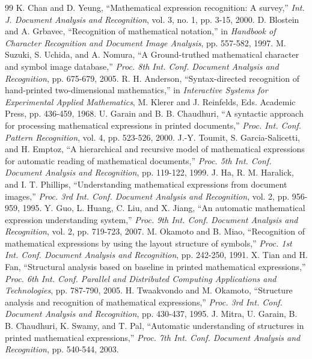 \documentclass[10pt]{article}
\begin{document}
\begin{thebibliography}{99}
 K. Chan and D. Yeung, ``Mathematical expression recognition: A survey,'' \textit{Int. J. Document Analysis and Recognition}, vol. 3, no. 1, pp. 3-15, 2000.
 D. Blostein and A. Grbavec, ``Recognition of mathematical notation,'' in \textit{Handbook of Character Recognition and Document Image Analysis}, pp. 557-582, 1997.
 M. Suzuki, S. Uchida, and A. Nomura, ``A Ground-truthed mathematical character and symbol image database,'' \textit{Proc. 8th Int. Conf. Document Analysis and Recognition}, pp. 675-679, 2005.
 R. H. Anderson, ``Syntax-directed recognition of hand-printed two-dimensional mathematics,'' in \textit{Interactive Systems for Experimental Applied Mathematics}, M. Klerer and J. Reinfelds, Eds. Academic Press, pp. 436-459, 1968.
 U. Garain and B. B. Chaudhuri, ``A syntactic approach for processing mathematical expressions in printed documents,'' \textit{Proc. Int. Conf. Pattern Recognition}, vol. 4, pp. 523-526, 2000.
 J.-Y. Toumit, S. Garcia-Salicetti, and H. Emptoz, ``A hierarchical and recursive model of mathematical expressions for automatic reading of mathematical documents,'' \textit{Proc. 5th Int. Conf. Document Analysis and Recognition}, pp. 119-122, 1999.
 J. Ha, R. M. Haralick, and I. T. Phillips, ``Understanding mathematical expressions from document images,'' \textit{Proc. 3rd Int. Conf. Document Analysis and Recognition}, vol. 2, pp. 956-959, 1995.
 Y. Guo, L. Huang, C. Liu, and X. Jiang, ``An automatic mathematical expression understanding system,'' \textit{Proc. 9th Int. Conf. Document Analysis and Recognition}, vol. 2, pp. 719-723, 2007.
 M. Okamoto and B. Miao, ``Recognition of mathematical expressions by using the layout structure of symbols,'' \textit{Proc. 1st Int. Conf. Document Analysis and Recognition}, pp. 242-250, 1991.
 X. Tian and H. Fan, ``Structural analysis based on baseline in printed mathematical expressions,'' \textit{Proc. 6th Int. Conf. Parallel and Distributed Computing Applications and Technologies}, pp. 787-790, 2005.
 H. Twaakvondo and M. Okamoto, ``Structure analysis and recognition of mathematical expressions,'' \textit{Proc. 3rd Int. Conf. Document Analysis and Recognition}, pp. 430-437, 1995.
 J. Mitra, U. Garain, B. B. Chaudhuri, K. Swamy, and T. Pal, ``Automatic understanding of structures in printed mathematical expressions,'' \textit{Proc. 7th Int. Conf. Document Analysis and Recognition}, pp. 540-544, 2003.

\end{thebibliography}
\end{document}
